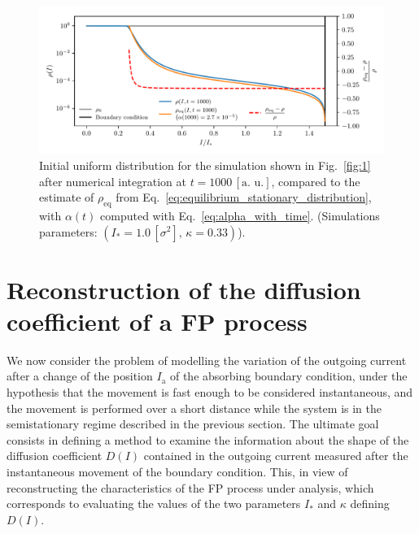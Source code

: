 {\begin{figure}[htp]
    \centering
    \includegraphics[width=\textwidth]{4_probing_the_diffusive_behavior/figs/final/new_stationary_distribution_s.pdf}
    \caption{Initial uniform distribution for the simulation shown in Fig.~\ref{fig:1} after numerical integration at $t=1000 \, [\text{a. u.}]$, compared to the estimate of $\rho_\mathrm{eq}$ from Eq.~\eqref{eq:equilibrium_stationary_distribution}, with $\alpha(t)$ computed with Eq.~\eqref{eq:alpha_with_time}. (Simulations parameters: $(I_\ast = 1.0\,[\sigma^2],\, \kappa = 0.33)$).}
    \label{fig:3}
\end{figure}


\section{Reconstruction of the diffusion coefficient of a FP process}
\label{sec:moving_the_absorbing_barrier}


We now consider the problem of modelling the variation of the outgoing current after a change of the position $I_\mathrm{a}$ of the absorbing boundary condition, under the hypothesis that the movement is fast enough to be considered instantaneous, and the movement is performed over a short distance while the system is in the semistationary regime described in the previous section. The ultimate goal consists in defining a method to examine the information about the shape of the diffusion coefficient $D(I)$ contained in the outgoing current measured after the instantaneous movement of the boundary condition. This, in view of reconstructing the characteristics of the FP process under analysis, which corresponds to evaluating the values of the two parameters $I_\ast$ and $\kappa$ defining $D(I)$.

}
